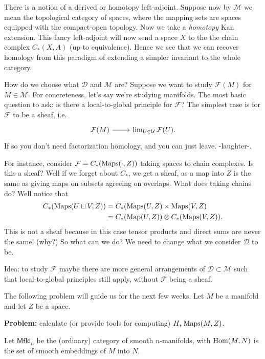 \documentclass{amsart}
\begin{document}
There is a notion of a derived or homotopy left-adjoint. Suppose now by $\mathcal{M}$
we mean the topological category of spaces, where the mapping sets are spaces equipped
with the compact-open topology. Now we take a \textit{homotopy} Kan extension. This
fancy left-adjoint will now send a space $X$ to the the chain complex $C_*(X, A)$
(up to equivalence). Hence we see that we can recover homology from this paradigm
of extending a simpler invariant to the whole category.

How do we choose what $\mathcal{D}$ and $\mathcal{M}$ are? Suppose we want to study
$\mathcal{F}(M)$ for $M\in\mathcal{M}$. For concreteness, let's say we're studying
manifolds. The most basic question to ask: is there a local-to-global principle for
$\mathcal{F}$? The simplest case is for $\mathcal{F}$ to be a sheaf, i.e.
\begin{equation*}
    \begin{tikzcd}
        \mathcal{F}(M) \rar & \lim_{U\in\mathcal{U}} \mathcal{F}(U).
    \end{tikzcd}
\end{equation*}
If so you don't need factorization homology, and you can just leave. -laughter-.

For instance, consider $\mathcal{F}=C_*(\operatorname{Maps}(\cdot, Z))$ taking spaces to chain
complexes. Is this a sheaf? Well if we forget about $C_*$, we get a sheaf, as a
map into $Z$ is the same as giving maps on subsets agreeing on overlaps. What does
taking chains do? Well notice that
\begin{align*}
    C_*(\operatorname{Maps}(U\sqcup V,Z)) &= C_*(\operatorname{Maps}(U,Z)\times\operatorname{Maps}(V,Z)\\
    &= C_*(\operatorname*{Map}(U,Z)) \otimes C_*(\operatorname{Maps}(V,Z)).
\end{align*}
This is not a sheaf because in this case tensor products and direct sums are never
the same! (why?) So what can we do? We need to change what we consider $\mathcal{D}$ to be.

Idea: to study $\mathcal{F}$ maybe there are more general arrangements of
$\mathcal{D}\subset\mathcal{M}$ such that local-to-global principles still apply, without
$\mathcal{F}$ being a sheaf.

The following problem will guide us for the next few weeks. Let $M$ be a manifold
and let $Z$ be a space.

\textbf{Problem:} calculate (or provide tools for computing) $H_*\operatorname{Maps}(M,Z)$.

\begin{definition}
    Let $\mathsf{Mfld}_n$ be the (ordinary) category of smooth $n$-manifolds, with
    $\operatorname{Hom}(M,N)$ is the set of smooth embeddings of $M$ into $N$.
\end{definition}
\end{document}
